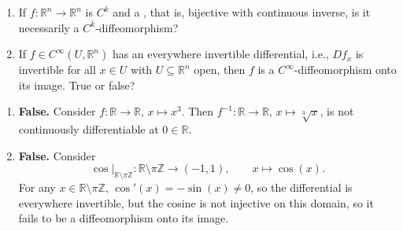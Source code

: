 \begin{question}
\begin{enumerate}[label=\textbf{Q\arabic*.}]
  \item If $f : \mathbb{R}^n \to \mathbb{R}^n$ is $C^k$ and a 
    , that is, bijective with continuous inverse, is it
    necessarily a $C^k$-diffeomorphism?
  \item If $f \in C^\infty(U,\mathbb{R}^n)$ has an everywhere invertible differential, i.e.,
    $Df_x$ is invertible for all $x \in U$ with $U \subseteq \mathbb{R}^n$ open, then $f$ is a
    $C^\infty$-diffeomorphism onto its image. True or false?
\end{enumerate}
\end{question}

\begin{answer}
\begin{enumerate}[label=\textbf{A\arabic*.}]
  \item \textbf{False.} Consider $f : \mathbb{R} \to \mathbb{R}$, $x \mapsto x^3$. Then
    $f^{-1} : \mathbb{R} \to \mathbb{R}$, $x \mapsto \sqrt[3]{x}$, is not continuously
    differentiable at $0 \in \mathbb{R}$.
  \item \textbf{False.} Consider
    \[\cos|_{\mathbb{R}\setminus\pi\mathbb{Z}} : \mathbb{R}\setminus\pi\mathbb{Z} \to (-1,1), \qquad x \mapsto \cos(x).\]
    For any $x \in \mathbb{R}\setminus\pi\mathbb{Z}$, $\cos'(x) = -\sin(x) \neq 0$, so the
    differential is everywhere invertible, but the cosine is not injective on this domain, so it
    fails to be a diffeomorphism onto its image.
\end{enumerate}
\end{answer}

\begin{center}
\end{center}

